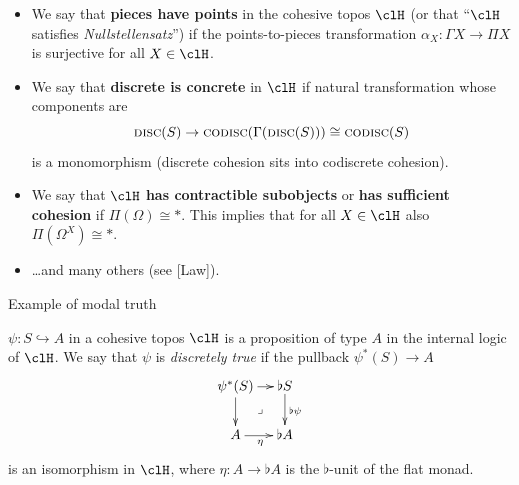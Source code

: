 \documentclass[presentation,handout]{beamer}
\begin{document}
\begin{frame}
  \begin{itemize}
    \item<+-> We say that \textbf{pieces have points} in the cohesive topos $\clH$ (or that ``$\clH$ satisfies \emph{Nullstellensatz}'') if the points-to-pieces transformation $\alpha_X\colon \Gamma X \to \Pi X$ is surjective for all $X\in\clH$.
    \item<+-> We say that \textbf{discrete is concrete} in $\clH$ if natural transformation whose components are
    \[
    \textsc{disc}(S) \to \textsc{codisc}(\Gamma(\textsc{disc}(S))) \cong \textsc{codisc}(S)
    \]
    is a monomorphism (discrete cohesion sits into codiscrete cohesion).
    \item<+-> We say that $\clH$ \textbf{has contractible subobjects} or \textbf{has sufficient cohesion} if $\Pi(\Omega)\cong *$. This implies that for all $X\in\clH$ also $\Pi(\Omega^X)\cong *$.
    
    \vspace*{\fill}
    \item<+-> \dots and many others (see [Law]).
  \end{itemize}
\end{frame}
%
%
%
%
%
%
%
%
%
%
%
%
%
%
\begin{frame}{Example of modal truth}
  \begin{df}
    $\psi\colon S\hookrightarrow A$ in a cohesive topos $\clH$ is a proposition of type $A$ in the internal logic of $\clH$. We say that $\psi$ is \emph{discretely true} if the pullback $\psi^*(S) \to A$
    \[
    \xymatrix@!=4mm{
    \psi^*(S) \ar[r]\ar[d]\ar@{}[dr]|\lrcorner & \flat S \ar[d]^{\flat\psi} \\
    A \ar[r]_\eta & \flat A
    }
    \]
    is an isomorphism in $\clH$, where $\eta : A\to \flat A$ is the $\flat$-unit of the flat monad.
  \end{df}
\end{frame}
\end{document}
